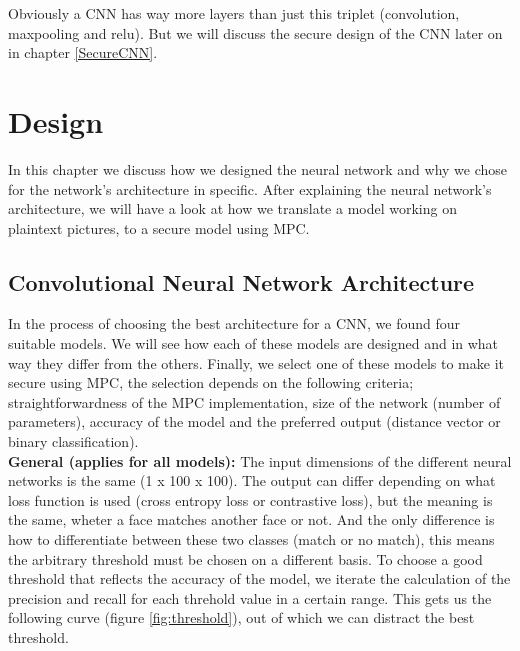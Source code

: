 Obviously a CNN has way more layers than just this triplet (convolution, maxpooling and relu). But we will discuss the secure design of the CNN later on in chapter \ref{SecureCNN}.

\section{Design}
\label{Design}
In this chapter we discuss how we designed the neural network and why we chose for the network's architecture in specific. After explaining the neural network's architecture, we will have a look at how we translate a model working on plaintext pictures, to a secure model using MPC.

\subsection{Convolutional Neural Network Architecture}
\label{ConvolutionalNeuralNetworkArchitecture}
In the process of choosing the best architecture for a CNN, we found four suitable models. We will see how each of these models are designed and in what way they differ from the others. Finally, we select one of these models to make it secure using MPC, the selection depends on the following criteria; straightforwardness of the MPC implementation, size of the network (number of parameters), accuracy of the model and the preferred output (distance vector or binary classification).\\

\textbf{General (applies for all models):} The input dimensions of the different neural networks is the same (1 x 100 x 100). The output can differ depending on what loss function is used (cross entropy loss or contrastive loss), but the meaning is the same, wheter a face matches another face or not. And the only difference is how to differentiate between these two classes (match or no match), this means the arbitrary threshold must be chosen on a different basis. To choose a good threshold that reflects the accuracy of the model, we iterate the calculation of the precision and recall for each threhold value in a certain range. This gets us the following curve (figure \ref{fig:threshold}), out of which we can distract the best threshold.\\

